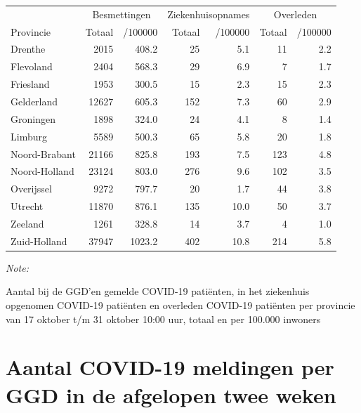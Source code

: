 \documentclass[
  english,
  man,floatsintext]{apa6}
\begin{document}
\begin{table}[H]
\centering
\begin{threeparttable}
\begin{tabular}{lrrrrrr}
\toprule
\multicolumn{1}{c}{ } & \multicolumn{2}{c}{Besmettingen} & \multicolumn{2}{c}{Ziekenhuisopnames} & \multicolumn{2}{c}{Overleden} \\
\cmidrule(l{3pt}r{3pt}){2-3} \cmidrule(l{3pt}r{3pt}){4-5} \cmidrule(l{3pt}r{3pt}){6-7}
Provincie & Totaal & /100000 & Totaal & /100000 & Totaal & /100000\\
\midrule
Drenthe & 2015 & 408.2 & 25 & 5.1 & 11 & 2.2\\
Flevoland & 2404 & 568.3 & 29 & 6.9 & 7 & 1.7\\
Friesland & 1953 & 300.5 & 15 & 2.3 & 15 & 2.3\\
Gelderland & 12627 & 605.3 & 152 & 7.3 & 60 & 2.9\\
Groningen & 1898 & 324.0 & 24 & 4.1 & 8 & 1.4\\
Limburg & 5589 & 500.3 & 65 & 5.8 & 20 & 1.8\\
Noord-Brabant & 21166 & 825.8 & 193 & 7.5 & 123 & 4.8\\
Noord-Holland & 23124 & 803.0 & 276 & 9.6 & 102 & 3.5\\
Overijssel & 9272 & 797.7 & 20 & 1.7 & 44 & 3.8\\
Utrecht & 11870 & 876.1 & 135 & 10.0 & 50 & 3.7\\
Zeeland & 1261 & 328.8 & 14 & 3.7 & 4 & 1.0\\
Zuid-Holland & 37947 & 1023.2 & 402 & 10.8 & 214 & 5.8\\
\bottomrule
\end{tabular}
\begin{tablenotes}
\item \textit{Note: } 
\item Aantal bij de GGD’en gemelde COVID-19 patiënten, in het ziekenhuis opgenomen COVID-19 patiënten en overleden COVID-19 patiënten per provincie van 17 oktober t/m 31 oktober 10:00 uur, totaal en per 100.000 inwoners
\end{tablenotes}
\end{threeparttable}
\end{table}

\newpage

\hypertarget{aantal-covid-19-meldingen-per-ggd-in-de-afgelopen-twee-weken}{%
\section{Aantal COVID-19 meldingen per GGD in de afgelopen twee weken}\label{aantal-covid-19-meldingen-per-ggd-in-de-afgelopen-twee-weken}}
\end{document}
